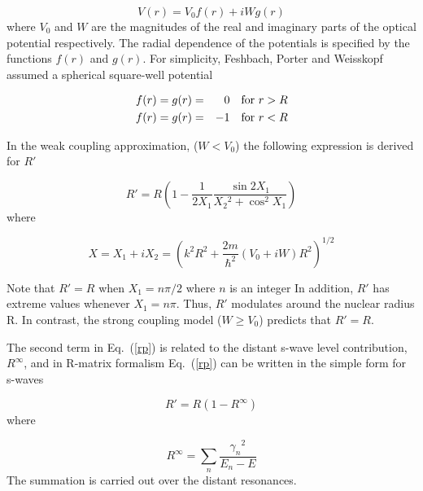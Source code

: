 \documentclass[twocolumn,amsmath,amssymb,10pt,groupedaddress,a4paper]{revtex4}
\begin{document}
\begin{equation}
 V(r) = V_0f(r) + iWg(r)
\end{equation}
\noindent where $V_{0}$ and $W$ are the magnitudes of the real and imaginary parts of the optical potential
respectively. The radial dependence of the potentials is specified by the functions $f(r)$ and $g(r)$.
For simplicity, Feshbach, Porter and Weisskopf \cite{Feshbach:54} assumed a spherical square-well potential

\begin{equation}
\begin{aligned}
 f(r) &= g(r) =& 0 \quad \text{for } r > R  \\
 f(r) &= g(r) =& -1 \quad \text{for } r < R   \notag
\end{aligned}
\end{equation}


In the weak coupling approximation, ($W < V_0$) the following expression is derived \cite{Feshbach:54} for $R'$

\begin{equation} R' = R \left( 1-\frac{1}{2X_1} \frac{\sin 2X_1}{X_2 \! ^2 + \cos^2 X_1} \right)
\label{rp}
\end{equation}
\noindent where

\begin{equation} X = X_1 + iX_2 = \left( k^2 R^2 + \frac{2m}{\hbar^2} (V_0 + iW)R^2 \right)^{1/2}
\label{xeq}
\end{equation}

Note that $R' = R$ when $X_1 = n\pi/2$ where $n$ is an integer In addition, $R'$ has extreme values
whenever $X_1 = n\pi$. Thus, $R'$ modulates around the nuclear radius R.
In contrast, the strong coupling model ($W \ge V_0$) predicts that $R' = R$.

The second term in Eq.~(\ref{rp}) is related to the distant s-wave level contribution, $R^\infty$,
and in R-matrix formalism Eq.~(\ref{rp}) can be written in the simple form for s-waves

\begin{equation}
 R' = R(1 - R^\infty)
\label{rpeqr}
\end{equation}
\noindent where

\begin{equation}
R^\infty = \sum_n \frac{\gamma_n \! ^2}{E_n - E}
\end{equation}
The summation is carried out over the distant resonances.
\end{document}
